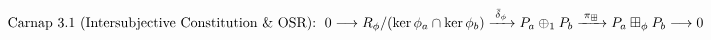\documentclass[preview]{standalone}
\begin{document}
\begin{align*}
\special{dvisvgm:raw <g id='unique000'>}\text{Carnap 3.1 (Intersubjective Constitution \& OSR): }\; 0 \longrightarrow R_\phi/(\ker\phi_a\cap\ker\phi_b) \xrightarrow{\;\bar{\delta}_\phi\;} P_a\oplus_1 P_b \xrightarrow{\;\pi_{\boxplus}\;} P_a\boxplus_\phi P_b \longrightarrow 0\special{dvisvgm:raw </g>}
\end{align*}
\end{document}
